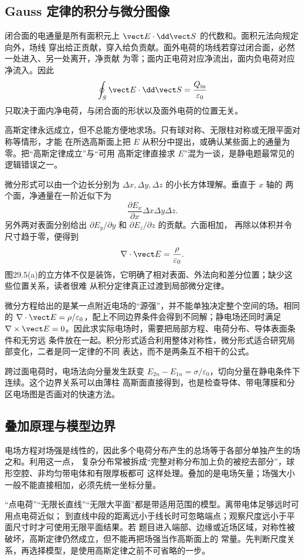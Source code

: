 \subsection*{Gauss 定律的积分与微分图像}

闭合面的电通量是所有面积元上 $\vect E\cdot\dd\vect S$ 的代数和。面积元法向规定向外，场线
穿出给正贡献，穿入给负贡献。面外电荷的场线若穿过闭合面，必然一处进入、另一处离开，净贡献
为零；面内正电荷对应净流出，面内负电荷对应净流入。因此
\[
  \oint_S\vect E\cdot\dd\vect S=\frac{Q_{\rm in}}{\varepsilon_0}
\]
只取决于面内净电荷，与闭合面的形状以及面外电荷的位置无关。

高斯定律永远成立，但不总能方便地求场。只有球对称、无限柱对称或无限平面对称等情形，才能
在所选高斯面上把 $E$ 从积分中提出，或确认某些面上的通量为零。把“高斯定律成立”与“可用
高斯定律直接求 $E$”混为一谈，是静电题最常见的逻辑错误之一。

微分形式可以由一个边长分别为 $\Delta x,\Delta y,\Delta z$ 的小长方体理解。垂直于 $x$ 轴的
两个面，净通量在一阶近似下为
\[
  \frac{\partial E_x}{\partial x}\Delta x\Delta y\Delta z.
\]
另外两对表面分别给出 $\partial E_y/\partial y$ 和 $\partial E_z/\partial z$ 的贡献。六面相加，
再除以体积并令尺寸趋于零，便得到
\[
  \nabla\cdot\vect E=\frac{\rho}{\varepsilon_0}.
\]
图29.5(a)的立方体不仅是装饰，它明确了相对表面、外法向和差分位置；缺少这些位置关系，读者很难
从积分定律真正过渡到局部微分定律。

微分方程给出的是某一点附近电场的“源强”，并不能单独决定整个空间的场。相同的
$\nabla\cdot\vect E=\rho/\varepsilon_0$，配上不同边界条件会得到不同解；静电场还同时满足
$\nabla\times\vect E=0$。因此求实际电场时，需要把局部方程、电荷分布、导体表面条件和无穷远
条件放在一起。积分形式适合利用整体对称性，微分形式适合研究局部变化，二者是同一定律的不同
表达，而不是两条互不相干的公式。

跨过面电荷时，电场法向分量发生跃变
$E_{2n}-E_{1n}=\sigma/\varepsilon_0$，切向分量在静电条件下连续。这个边界关系可以由薄柱
高斯面直接得到，也是检查导体、带电薄膜和分区电场图是否画对的快速方法。

\subsection*{叠加原理与模型边界}

电场方程对场强是线性的，因此多个电荷分布产生的总场等于各部分单独产生的场之和。利用这一点，
复杂分布常被拆成“完整对称分布加上负的被挖去部分”，球形空腔、非均匀带电体和有限厚板都可
这样处理。叠加的是电场矢量；场强大小一般不能直接相加，必须先统一坐标分量。

“点电荷”“无限长直线”“无限大平面”都是带适用范围的模型。离带电体足够远时可用点电荷近似；
到直线中段的距离远小于线长时可忽略端点；观察尺度远小于平面尺寸时才可使用无限平面结果。若
题目进入端部、边缘或近场区域，对称性被破坏，高斯定律仍然成立，但不能再把场强当作高斯面上的
常量。先判断尺度关系，再选择模型，是使用高斯定律之前不可省略的一步。
